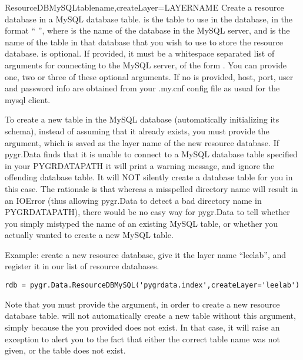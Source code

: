 \documentclass{howto}
\begin{document}
\begin{funcdesc}{ResourceDBMySQL}{tablename,createLayer=LAYERNAME}
  Create a resource database in a MySQL database table.
   is the table to use in the database, in the format
  `` '', where  is the name of the
  database in the MySQL server, and  is the name of
  the table in that database that you wish to use to store the
  resource database.   is optional.
  If provided, it must be a whitespace separated 
  list of arguments for connecting to the MySQL server, of the form
    .  You can provide one, two
  or three of these optional arguments.
  If no  is provided, host, port, user and password info are obtained
  from your .my.cnf config file as usual for the mysql client.

  To create a new table in the MySQL database (automatically initializing its schema),
  instead of assuming that it already exists, you must provide
  the  argument, which is saved as the layer name
  of the new resource database.  If pygr.Data finds that it is unable
  to connect to a MySQL database table specified in your PYGRDATAPATH
  it will print a warning message, and ignore the offending database table.
  It will NOT silently create a database table for you in this case.
  The rationale is that whereas a misspelled directory name will result in
  an IOError (thus allowing pygr.Data to detect a bad directory name in PYGRDATAPATH),
  there would be no easy way for pygr.Data to tell whether you simply mistyped the name
  of an existing MySQL table, or whether you actually wanted to create a new MySQL table.

  Example: create a new resource database, give it the layer name ``leelab'',
  and register it in our list of resource databases.
\begin{verbatim}
rdb = pygr.Data.ResourceDBMySQL('pygrdata.index',createLayer='leelab')
\end{verbatim}
  Note that you must provide the  argument, in order to 
  create a new resource database table.   will not
  automatically create a new table without this argument, simply because the
   you provided does not exist.  In that case, it will
  raise an exception to alert you to the fact that either the correct table name
  was not given, or the table does not exist.
\end{funcdesc}
\end{document}
